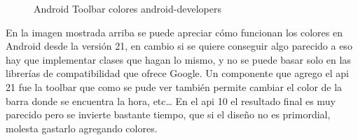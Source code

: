 \begin{figure}[H] 
  \begin{center} 
    \caption{Android Toolbar colores android-developers} 
    \label{fig:AndroidToolbar} 
  \end{center} 
\end{figure}

En la imagen mostrada arriba se puede apreciar cómo funcionan los colores en Android desde la versión 21, en cambio si se quiere conseguir algo parecido a eso hay que implementar clases que hagan lo mismo, y no se puede basar solo en las librerías de compatibilidad que ofrece Google.
Un componente que agrego el api 21 fue la toolbar que como se pude ver también permite cambiar el color de la barra donde se encuentra la hora, etc…
En el api 10 el resultado final es muy parecido pero se invierte bastante tiempo, que si el diseño no es primordial, molesta gastarlo agregando colores.

